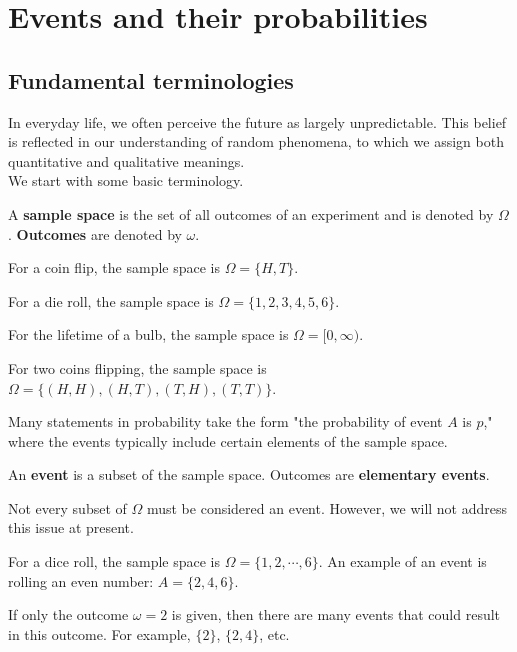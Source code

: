 \documentclass{huhtakm-template-book}
\begin{document}
\chapter{Events and their probabilities}
\section{Fundamental terminologies}
    In everyday life, we often perceive the future as largely unpredictable. This belief is reflected in our understanding of random phenomena, to which we assign both quantitative and qualitative meanings.\\
    We start with some basic terminology.
    \begin{defn} %
        A \textbf{sample space} is the set of all outcomes of an experiment and is denoted by $\Omega$. \textbf{Outcomes} are denoted by $\omega$.
    \end{defn}
    \begin{eg}
        For a coin flip, the sample space is $\Omega=\{H,T\}$.
    \end{eg}
    \begin{eg}
        For a die roll, the sample space is $\Omega=\{1,2,3,4,5,6\}$.
    \end{eg}
    \begin{eg}
        For the lifetime of a bulb, the sample space is $\Omega=[0,\infty)$.
    \end{eg}
    \begin{eg}
        For two coins flipping, the sample space is $\Omega=\{(H,H),(H,T),(T,H),(T,T)\}$.
    \end{eg}
    Many statements in probability take the form "the probability of event $A$ is $p$," where the events typically include certain elements of the sample space.
    \begin{defn} %
        An \textbf{event} is a subset of the sample space. Outcomes are \textbf{elementary events}.
    \end{defn}
    \begin{rem}
        Not every subset of $\Omega$ must be considered an event. However, we will not address this issue at present.
    \end{rem}
    \begin{eg}
        For a dice roll, the sample space is $\Omega=\{1,2,\cdots,6\}$. An example of an event is rolling an even number: $A=\{2,4,6\}$.
    \end{eg}
    \begin{rem}
        If only the outcome $\omega=2$ is given, then there are many events that could result in this outcome. For example, $\{2\}$, $\{2,4\}$, etc.
    \end{rem}
\end{document}
